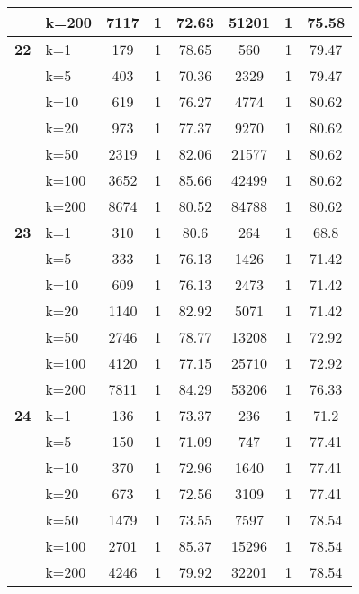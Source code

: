 \begin{table}[htbp]
\begin{tabular}{ll|ccc|ccc}
     & k=200 & 7117 & 1 & 72.63 & 51201 & 1 & 75.58 \\ \hline
    \multicolumn{1}{r}{\textbf{22}} & k=1 & 179 & 1 & 78.65 & 560 & 1 & 79.47 \\ 
     & k=5 & 403 & 1 & 70.36 & 2329 & 1 & 79.47 \\ 
     & k=10 & 619 & 1 & 76.27 & 4774 & 1 & 80.62 \\ 
     & k=20 & 973 & 1 & 77.37 & 9270 & 1 & 80.62 \\ 
     & k=50 & 2319 & 1 & 82.06 & 21577 & 1 & 80.62 \\ 
     & k=100 & 3652 & 1 & 85.66 & 42499 & 1 & 80.62 \\ 
     & k=200 & 8674 & 1 & 80.52 & 84788 & 1 & 80.62 \\ \hline
    \multicolumn{1}{r}{\textbf{23}} & k=1 & 310 & 1 & 80.6 & 264 & 1 & 68.8 \\ 
     & k=5 & 333 & 1 & 76.13 & 1426 & 1 & 71.42 \\ 
     & k=10 & 609 & 1 & 76.13 & 2473 & 1 & 71.42 \\ 
     & k=20 & 1140 & 1 & 82.92 & 5071 & 1 & 71.42 \\ 
     & k=50 & 2746 & 1 & 78.77 & 13208 & 1 & 72.92 \\ 
     & k=100 & 4120 & 1 & 77.15 & 25710 & 1 & 72.92 \\ 
     & k=200 & 7811 & 1 & 84.29 & 53206 & 1 & 76.33 \\ \hline
    \multicolumn{1}{r}{\textbf{24}} & k=1 & 136 & 1 & 73.37 & 236 & 1 & 71.2 \\ 
     & k=5 & 150 & 1 & 71.09 & 747 & 1 & 77.41 \\ 
     & k=10 & 370 & 1 & 72.96 & 1640 & 1 & 77.41 \\ 
     & k=20 & 673 & 1 & 72.56 & 3109 & 1 & 77.41 \\ 
     & k=50 & 1479 & 1 & 73.55 & 7597 & 1 & 78.54 \\ 
     & k=100 & 2701 & 1 & 85.37 & 15296 & 1 & 78.54 \\ 
     & k=200 & 4246 & 1 & 79.92 & 32201 & 1 & 78.54 \\ \hline
    \end{tabular}
    \label{use_case_4}
    \end{table}
    